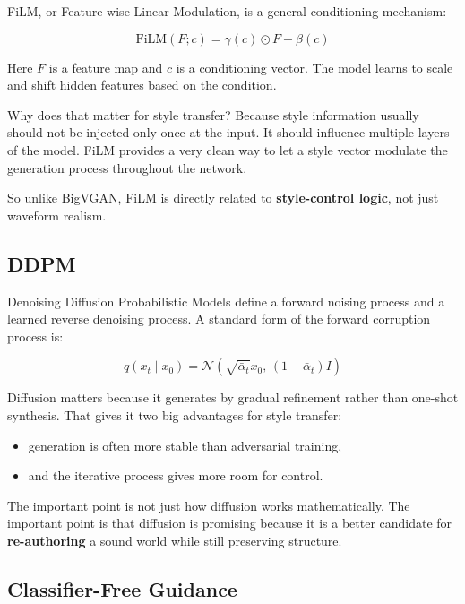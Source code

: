 \documentclass[11pt]{article}
\begin{document}
FiLM, or Feature-wise Linear Modulation, is a general conditioning mechanism:

\begin{equation*}
\mathrm{FiLM}(F;c)=\gamma(c)\odot F+\beta(c)
\end{equation*}

Here \(F\) is a feature map and \(c\) is a conditioning vector. The model learns to scale and shift hidden features based on the condition.

Why does that matter for style transfer? Because style information usually should not be injected only once at the input. It should influence multiple layers of the model. FiLM provides a very clean way to let a style vector modulate the generation process throughout the network.

So unlike BigVGAN, FiLM is directly related to \textbf{style-control logic}, not just waveform realism.

\subsection{DDPM}

Denoising Diffusion Probabilistic Models define a forward noising process and a learned reverse denoising process. A standard form of the forward corruption process is:

\begin{equation*}
q(x_t\mid x_0)=\mathcal{N}\!\left(\sqrt{\bar{\alpha}_t}x_0,\,(1-\bar{\alpha}_t)I\right)
\end{equation*}

Diffusion matters because it generates by gradual refinement rather than one-shot synthesis. That gives it two big advantages for style transfer:

\begin{itemize}
\item generation is often more stable than adversarial training,
\item and the iterative process gives more room for control.
\end{itemize}

The important point is not just how diffusion works mathematically. The important point is that diffusion is promising because it is a better candidate for \textbf{re-authoring} a sound world while still preserving structure.

\subsection{Classifier-Free Guidance}
\end{document}
